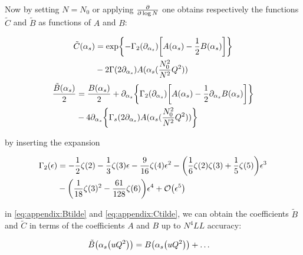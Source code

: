 \documentclass[../main.tex]{subfiles}
\begin{document}
Now by setting $N=N_0$ or applying $\pdv{\log N}$ one obtains respectively the functions $\tilde{C}$ and  $\tilde{B}$ as functions of $A$ and $B$:

\begin{equation}\label{eq:appendix:Ctilde}
    \begin{split}
    \tilde{C}(\alpha_s) &= \exp{-\Gamma_2(\partial_{\alpha_s}) \qty[A(\alpha_s)-\frac{1}{2} B(\alpha_s)]}\\
    &- 2 \Gamma\qty(2\partial_{\alpha_s}) A(\alpha_s(\frac{N_0^2}{N^2}Q^2)) 
    \end{split}
\end{equation}
\begin{equation}\label{eq:appendix:Btilde}
    \begin{split}
    \frac{\tilde{B}(\alpha_s)}{2} &= \frac{B(\alpha_s)}{2} + \partial_{\alpha_s} \qty{\Gamma_2(\partial_{\alpha_s}) \qty[A(\alpha_s)-\frac{1}{2} \partial_{\alpha_s}B(\alpha_s)]} \\
    &- 4 \partial_{\alpha_s} \qty{\Gamma_s\qty(2\partial_{\alpha_s}) A(\alpha_s(\frac{N_0^2}{N^2}Q^2))} 
\end{split}
\end{equation}

by inserting the expansion 

\begin{align}
    \begin{split}
    \Gamma_2(\epsilon) &= -\frac{1}{2}\zeta(2) -\frac{1}{3}\zeta(3) \epsilon - \frac{9}{16}\zeta(4) \epsilon^2 - \qty(\frac{1}{6}\zeta(2)\zeta(3)+ \frac{1}{5}\zeta(5))\epsilon^3 \\
    &- \qty(\frac{1}{18}\zeta(3)^2 - \frac{61}{128}\zeta(6))\epsilon^4 + \order{\epsilon^5}   
    \end{split}
\end{align}

in \cref{eq:appendix:Btilde} and \cref{eq:appendix:Ctilde}, we can obtain the coefficients $\tilde{B}$ and $\tilde{C}$ in terms of the coefficients $A$ and $B$ up to $N^4LL$ accuracy: 

\begin{align}
    \begin{split}
    \tilde{B}\qty(\alpha_s \qty(u Q^2)) &= B\qty(\alpha_s \qty(u Q^2))  + \dots
    \end{split}
\end{align}
\end{document}

